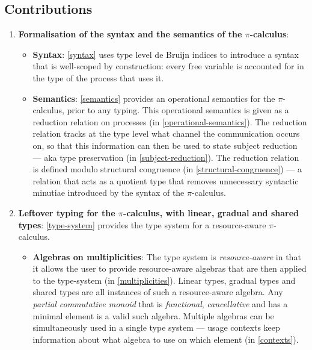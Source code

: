 \documentclass[a4paper,UKenglish,cleveref,autoref,thm-restate,authorcolumns]{lipics-v2019}
\theoremstyle{definition}
\newcommand{\picalc}{$\pi$-calculus}
\begin{document}
\subsection{Contributions}
\begin{enumerate}
\item \textbf{Formalisation of the syntax and the semantics of the \picalc{}}:
 \begin{itemize}
   \item \textbf{Syntax}: \autoref{syntax} uses type level de Bruijn indices \cite{deBruijn1972} to introduce a syntax that is well-scoped by construction: every free variable is accounted for in the type of the process that uses it.
   
   \item \textbf{Semantics}: \autoref{semantics} provides an operational semantics for the \picalc{}, prior to any typing.
   This operational semantics is given as a reduction relation on processes (in \autoref{operational-semantics}).
   The reduction relation tracks at the type level what channel the communication occurs on, so that this information can then be used to state subject reduction --- aka type preservation (in \autoref{subject-reduction}).
   The reduction relation is defined modulo structural congruence (in \autoref{structural-congruence}) --- a relation that acts as a quotient type that removes unnecessary syntactic minutiae introduced by the syntax of the \picalc{}.
 \end{itemize}
  
  \item \textbf{Leftover typing for the \picalc{}, with linear, gradual and shared types}:
  \autoref{type-system} provides the type system for a resource-aware \picalc{}.
  \begin{itemize}
    \item \textbf{Algebras on multiplicities}: The type system is \emph{resource-aware} in that it allows the user to provide resource-aware algebras that are then applied to the type-system (in \autoref{multiplicities}).
    Linear types, gradual types and shared types are all instances of such a resource-aware algebra.
    Any \emph{partial commutative monoid} that is \emph{functional}, \emph{cancellative} and has a minimal element is a valid such algebra.
    Multiple algebras can be simultaneously used in a single type system --- usage contexts keep information about what algebra to use on which element (in \autoref{contexts}).


\end{itemize}
\end{enumerate}
\end{document}
